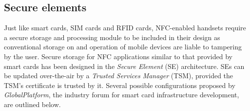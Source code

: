 
\subsection{Secure elements}
Just like smart cards, SIM cards and RFID cards, NFC-enabled handsets require a secure storage and processing module to be included in their design as conventional storage on and operation of mobile devices are liable to tampering by the user.
Secure storage for NFC applications similar to that provided by smart cards has been designed in the \textit{Secure Element} (SE) architecture.
SEs can be updated over-the-air by a \textit{Trusted Services Manager} (TSM), provided the TSM's certificate is trusted by it.
Several possible configurations proposed by \textit{GlobalPlatform}, the industry forum for smart card infrastructure development, are outlined below. \cite{Reveilhac:2009:PSE:1548884.1549404,GlobalPlatformSEs}






